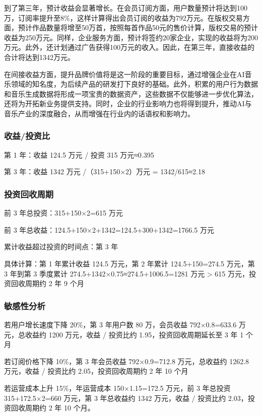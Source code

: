 \documentclass{base}
\numberwithin{figure}{section} %
\begin{document}
到了第三年，预计收益会显著增长。在会员订阅方面，用户数量预计将达到100万，订阅率提升至8\%，这样计算得出会员订阅的收益为792万元。在版权交易方面，预计作品数量将增至50万首，按照每首作品50元的售价计算，版权交易的预计收益为250万元。同样，企业服务方面，预计将签约20家企业，实现的收益将为200万元。此外，还计划通过广告获得100万元的收入。因此，在第三年，直接收益的合计将达到1342万元。

在间接收益方面，提升品牌价值将是这一阶段的重要目标，通过增强企业在AI音乐领域的知名度，为后续产品的研发打下良好的基础。此外，积累的用户行为数据和音乐生成数据将形成一项宝贵的数据资产，这些数据不仅能够进一步优化算法，还将为开拓新业务提供支持。同时，企业的行业影响力也将得到提升，推动AI与音乐产业的深度融合，从而增强在行业内的话语权和影响力。

\subsubsection{收益/投资比}

第 1 年：收益 124.5 万元 / 投资 315 万元≈0.395

第 3 年：收益 1342 万元 /（315+150×2）万元 = 1342/615≈2.18

\subsubsection{投资回收周期}

前 3 年总投资：315+150×2=615 万元

前 3 年总收益：124.5+150×2+1342=124.5+300+1342=1766.5 万元

累计收益超过投资的时间点：第 3 年

具体计算：第 1 年累计收益 124.5 万元，第 2 年累计 124.5+150=274.5 万元，第 3 年到第 3 季度累计 274.5+1342×0.75≈274.5+1006.5=1281 万元 > 615 万元，投资回收周期约 2 年 9 个月

\subsubsection{敏感性分析}


若用户增长速度下降 20\%，第 3 年用户数 80 万，会员收益 792×0.8=633.6 万元，总收益约 1200 万元，收益 / 投资比约 1.95，投资回收周期延长至 3 年 1 个月

若订阅价格下降 10\%，第 3 年会员收益 792×0.9=712.8 万元，总收益约 1262.8 万元，收益 / 投资比约 2.05，投资回收周期约 2 年 10 个月

若运营成本上升 15\%，年运营成本 150×1.15=172.5 万元，前 3 年总投资 315+172.5×2=660 万元，第 3 年总收益约 1342 万元，收益 / 投资比约 2.03，投资回收周期约 2 年 10 个月。
\end{document}
